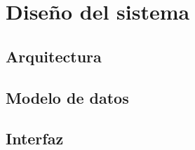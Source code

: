 \chapter{Diseño del sistema}
\label{ch:diseno}
\section{Arquitectura}

\section{Modelo de datos}

\section{Interfaz}